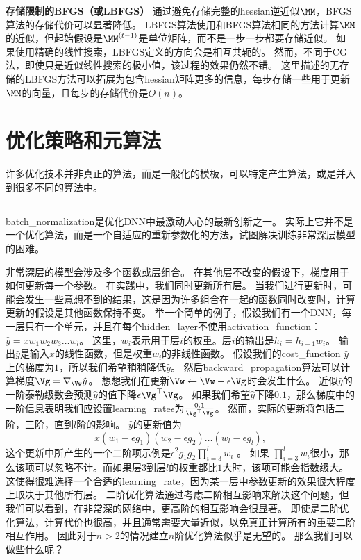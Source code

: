 \textbf{存储限制的\gls{BFGS}（或\gls{LBFGS}）}
通过避免存储完整的\gls{hessian}逆近似$\MM$，\gls{BFGS}算法的存储代价可以显著降低。
\gls{LBFGS}算法使用和\gls{BFGS}算法相同的方法计算$\MM$的近似，但起始假设是$\MM^{(t-1)}$是单位矩阵，而不是一步一步都要存储近似。
如果使用精确的线性搜索，\gls{LBFGS}定义的方向会是相互共轭的。
然而，不同于\gls{CG}法，即使只是近似线性搜索的极小值，该过程的效果仍然不错。
这里描述的无存储的\gls{LBFGS}方法可以拓展为包含\gls{hessian}矩阵更多的信息，每步存储一些用于更新$\MM$的向量，且每步的存储代价是$O(n)$。


\section{优化策略和元算法}
\label{sec:optimization_strategies_and_meta_algorithms}
许多优化技术并非真正的算法，而是一般化的模板，可以特定产生算法，或是并入到很多不同的算法中。

\subsection{}
\label{sec:batch_normalization}
\gls{batch_normalization}\citep{Ioffe+Szegedy-2015}是优化\gls{DNN}中最激动人心的最新创新之一。
实际上它并不是一个优化算法，而是一个自适应的重新参数化的方法，试图解决训练非常深层模型的困难。

非常深层的模型会涉及多个函数或层组合。
在其他层不改变的假设下，梯度用于如何更新每一个参数。
在实践中，我们同时更新所有层。
当我们进行更新时，可能会发生一些意想不到的结果，这是因为许多组合在一起的函数同时改变时，计算更新的假设是其他函数保持不变。
举一个简单的例子，假设我们有一个\gls{DNN}，每一层只有一个单元，并且在每个\gls{hidden_layer}不使用\gls{activation_function}：$\hat{y} = xw_1 w_2 w_3 \dots w_l$。
这里，$w_i$表示用于层$i$的权重。层$i$的输出是$h_i = h_{i-1} w_i$。
输出$\hat{y}$是输入$x$的线性函数，但是权重$w_i$的非线性函数。
假设我们的\gls{cost_function} $\hat{y}$上的梯度为$1$，所以我们希望稍稍降低$\hat{y}$。
然后\gls{backward_propagation}算法可以计算梯度$\Vg = \nabla_{\Vw} \hat{y}$。
想想我们在更新$\Vw \leftarrow \Vw - \epsilon \Vg$时会发生什么。
近似$\hat{y}$的一阶泰勒级数会预测$\hat{y}$的值下降$\epsilon \Vg^\top \Vg$。
如果我们希望$\hat{y}$下降$0.1$，那么梯度中的一阶信息表明我们应设置\gls{learning_rate}$\epsilon$为$\frac{0.1}{\Vg^\top \Vg}$。
然而，实际的更新将包括二阶，三阶，直到$l$阶的影响。
$\hat{y}$的更新值为
\begin{equation}
    x(w_1-\epsilon g_1)(w_2-\epsilon g_2)\dots(w_l-\epsilon g_l),
\end{equation}
这个更新中所产生的一个二阶项示例是$\epsilon^2 g_1 g_2 \prod_{i=3}^l w_i$ 。
如果 $\prod_{i=3}^l w_i$很小，那么该项可以忽略不计。而如果层$3$到层$l$的权重都比$1$大时，该项可能会指数级大。
这使得很难选择一个合适的\gls{learning_rate}，因为某一层中参数更新的效果很大程度上取决于其他所有层。
二阶优化算法通过考虑二阶相互影响来解决这个问题，但我们可以看到，在非常深的网络中，更高阶的相互影响会很显著。
即使是二阶优化算法，计算代价也很高，并且通常需要大量近似，以免真正计算所有的重要二阶相互作用。
因此对于$n>2$的情况建立$n$阶优化算法似乎是无望的。
那么我们可以做些什么呢？

